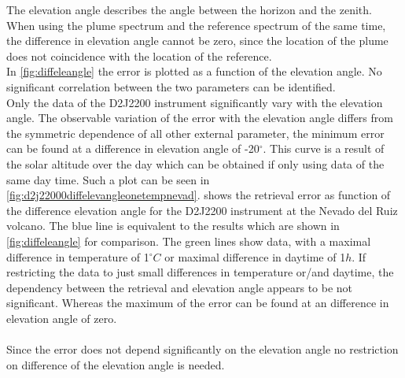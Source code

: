 The elevation angle describes the angle between the horizon and the zenith. When using the plume spectrum and the reference spectrum of the same time, the difference in elevation angle cannot be zero, since the location of the plume does not coincidence with the location of the reference.\\
In \cref{fig:diffeleangle} the  error is plotted as a function of the elevation angle. No significant correlation between the two parameters can be identified. \\
Only the data of the D2J2200 instrument significantly vary with the elevation angle. The observable variation of the  error with the elevation angle differs from the symmetric dependence of all other external parameter, the minimum  error can be found at a difference in elevation angle of -20$^{\circ}$. This curve is a result of the solar altitude over the day which can be obtained if only using data of the same day time. Such a plot can be seen in \cref{fig:d2j22000diffelevangleonetempnevad}.
 shows the  retrieval error as function of the difference elevation angle for the D2J2200 instrument at the Nevado del Ruiz volcano. The blue line is equivalent to the results which are shown in \cref{fig:diffeleangle} for comparison. The green lines show data, with a maximal difference in temperature of 1$^{\circ}C$ or maximal difference in daytime of 1$h$. If restricting the data to just small differences in temperature or/and daytime, the dependency between the  retrieval and elevation angle appears to be not significant. Whereas the maximum of the  error can be found at an difference in elevation angle of zero.\\
\\	
Since the  error does not depend significantly on the elevation angle no restriction on difference of the elevation angle is needed.

